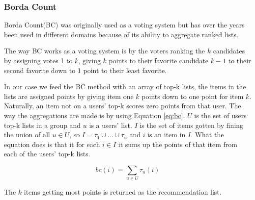 \subsubsection{Borda Count}\label{sec:bordacount}
Borda Count(BC) was originally used as a voting system but has over the years been used in different domains because of its ability to aggregate ranked lists\cite{Baltrunas:2010:GRR:1864708.1864733, Masthoff2004}.

The way BC works as a voting system is by the voters ranking the $k$ candidates by assigning votes 1 to $k$, giving $k$ points to their favorite candidate $k-1$ to their second favorite down to 1 point to their least favorite.

In our case we feed the BC method with an array of top-k lists, the items in the lists are assigned points by giving item one $k$ points down to one point for item $k$\cite{ourreport}.  Naturally, an item not on a users' top-k scores zero points from that user. The way the aggregations are made is by using Equation \ref{eq:bc}. $U$ is the set of users top-k lists in a group and $u$ is a users' list. $I$ is the set of items gotten by fining the union of all $u\in U$, so $I = \tau_1 \cup ... \cup \tau_u$ and $i$ is an item in $I$. What the equation does is that it for each $i\in I$ it sums up the points of that item from each of the users' top-k lists.


\begin{equation}\label{eq:bc}
bc(i) = \sum_{u\in U} \tau_u(i)
\end{equation}

The $k$ items getting most points is returned as the recommendation list.